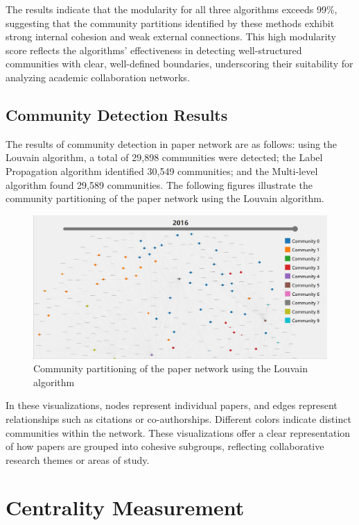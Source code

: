 \documentclass[11pt]{article}
\begin{document}
The results indicate that the modularity for all three algorithms exceeds 99\%, suggesting that the community partitions identified by these methods exhibit strong internal cohesion and weak external connections. This high modularity score reflects the algorithms' effectiveness in detecting well-structured communities with clear, well-defined boundaries, underscoring their suitability for analyzing academic collaboration networks. 


\subsection{Community Detection Results}
The results of community detection in paper network are as follows: using the Louvain algorithm, a total of 29,898 communities were detected; the Label Propagation algorithm identified 30,549 communities; and the Multi-level algorithm found 29,589 communities. The following figures illustrate the community partitioning of the paper network using the Louvain algorithm.

\begin{figure}
    \centering
    \includegraphics[width=1\linewidth]{img/community.jpg}
    \caption{Community partitioning of the paper network using the Louvain algorithm}
    \label{fig:community}
\end{figure}

In these visualizations, nodes represent individual papers, and edges represent relationships such as citations or co-authorships. Different colors indicate distinct communities within the network. These visualizations offer a clear representation of how papers are grouped into cohesive subgroups, reflecting collaborative research themes or areas of study.



\section{Centrality Measurement}
\end{document}
